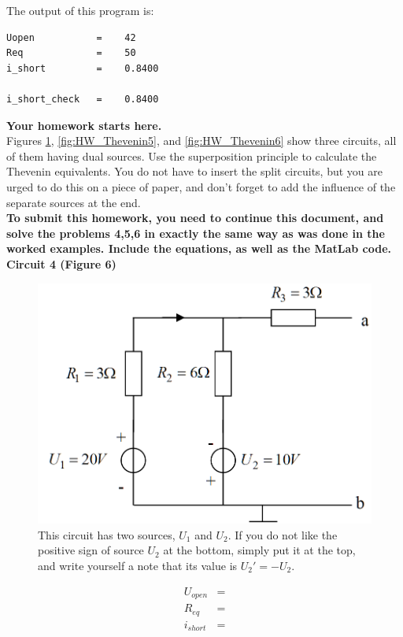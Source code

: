 \documentclass[11pt,letterpaper]{article}
\begin{document}
The output of this program is:

\begin{lstlisting}
Uopen 			=    42
Req 			=    50
i_short 		=    0.8400

i_short_check 	=    0.8400
\end{lstlisting}

\newpage
\textbf{Your homework starts here.}\\

Figures \ref{fig:HW_Thevenin4},  \ref{fig:HW_Thevenin5}, and \ref{fig:HW_Thevenin6} show three circuits, all of them having dual sources. Use the superposition principle to calculate the Thevenin equivalents. You do not have to insert the split circuits, but you are urged to do this on a piece of paper, and don't forget to add the influence of the separate sources at the end.\\

\textbf{To submit this homework, you need to continue this document, and solve the problems 4,5,6 in exactly the same way as was done in the worked examples. Include the equations, as well as the MatLab code.
}\\

\newpage
\textbf{Circuit 4 (Figure 6)}

\begin{figure}
\centering
\includegraphics[width=0.65\linewidth]{HW_Thevenin4}
\caption{This circuit has two sources, $U_1$ and $U_2$. If you do not like the positive sign of source $U_2$ at the bottom, simply put it at the top, and write yourself a note that its value is $U_2' = -U_2$.}
\label{fig:HW_Thevenin4}
\end{figure}


\begin{align}\label{Eqn:HW_Thevenin6}
U_{open} &=  \\
R_{eq}  &=  \\
i_{short} &=
\end{align}
\end{document}
